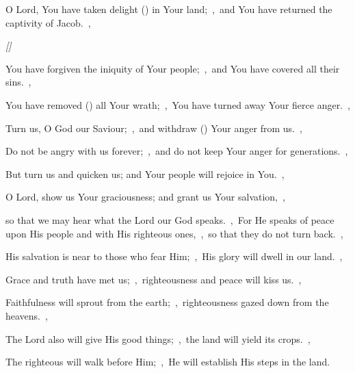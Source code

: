\documentclass[12pt,twoside,a5paper]{article}
\begin{document}


\begin{normalparskip}
  O Lord, You have taken delight () in Your land;~\sep\ and You have returned the captivity of Jacob.~\sep


  \emph{[]}

  You have forgiven the iniquity of Your people;~\sep\ and You have covered all their sins.~\sep

  You have removed () all Your wrath;~\sep\ You have turned away Your fierce anger.~\sep

  Turn us, O God our Saviour;~\sep\ and withdraw () Your anger from us.~\sep

  Do not be angry with us forever;~\sep\ and do not keep Your anger for generations.~\sep

  But turn us and quicken us; and Your people will rejoice in You.~\sep

  O Lord, show us Your graciousness; and grant us Your salvation,~\sep

  so that we may hear what the Lord our God speaks.~\sep\ For He speaks of peace upon His people and with His righteous ones,~\sep\ so that they do not turn back.~\sep

  His salvation is near to those who fear Him;~\sep\ His glory will dwell in our land.~\sep

  Grace and truth have met us;~\sep\ righteousness and peace will kiss us.~\sep

  Faithfulness will sprout from the earth;~\sep\ righteousness gazed down from the heavens.~\sep

  The Lord also will give His good things;~\sep\ the land will yield its crops.~\sep

  The righteous will walk before Him;~\sep\ He will establish His steps in the land.
\end{normalparskip}

\end{document}
